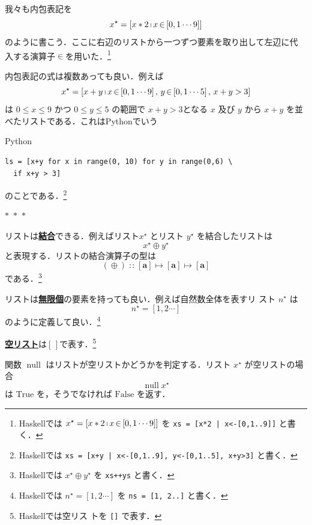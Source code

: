 \documentclass[a5paper,twoside,fleqn,draft]{jsbook}
\newcommand{\separator}{\begin{center}$*$~$*$~$*$\end{center}}
\newcommand{\programminglanguage}[1]{\textsf{#1}}
\newcommand{\haskell}{\programminglanguage{Haskell}}
\newcommand{\python}{\programminglanguage{Python}}
\newcommand{\keyword}[1]{{\underline{\textbf{#1}}}}
\newcommand{\code}[1]{\texttt{#1}}
\newenvironment{pythoncode}{\begin{itembox}[r]{\python}}{\end{itembox}}
\newcommand{\mSpecialConstant}[1]{\textrm{#1}} %
\newcommand{\mEmptyList}{{[\,]}}
\newcommand{\mFalse}{\mSpecialConstant{False}}
\newcommand{\mTrue}{\mSpecialConstant{True}}
\newcommand{\mSpecialFunc}[1]{\mathrm{#1}}
\DeclareMathOperator{\mNull}{\mSpecialFunc{null}}
\DeclareMathOperator{\mAppend}{\oplus}
\DeclareMathOperator{\mFrom}{\in}
\DeclareMathOperator{\mIn}{{:\!:}}
\DeclareMathOperator{\mMapsTo}{\mapsto}
\newcommand{\mType}[1]{\mathbf{#1}}
\newcommand{\mListType}[1]{[\mType{#1}]}
\newcommand{\mListWith}[1]{\left[#1\right]}
\newcommand{\mList}[1]{{#1}^\mathrm{\star}}
\DeclareMathOperator{\mListComp}{\shortmid}
\newcommand{\mProj}[2]{#1\mMapsTo#2}
\begin{document}
我々も内包表記を
\begin{equation}
  \mList{x}=\mListWith{x*2\mListComp x\mFrom{\mListWith{0,1\dotsb9}}}
\end{equation}
のように書こう．ここに右辺のリストから一つずつ要素を取り出して左辺に代
入する演算子$\mFrom$を用いた．\footnote{\haskell では
  $\mList{x}=\mListWith{x*2\mListComp x\mFrom{\mListWith{0,1\dotsb9}}}$
  を \code{xs = [x*2 | x<-[0,1..9]]} と書く．}

内包表記の式は複数あっても良い．例えば
\begin{equation}
  \mList{x}
  =\mListWith{x+y\mListComp x\mFrom\mListWith{0,1\dotsb9},\,
      y\mFrom\mListWith{0,1\dotsb5},\,x+y>3}
\end{equation}
は $0\le x\le9$ かつ $0\le y\le5$ の範囲で $x+y>3$となる $x$ 及び $y$
から $x+y$ を並べたリストである．これは\python でいう
\begin{pythoncode}
\begin{verbatim}
ls = [x+y for x in range(0, 10) for y in range(0,6) \
  if x+y > 3]
\end{verbatim}
\end{pythoncode}
のことである．\footnote{\haskell では \code{xs = [x+y | x<-[0,1..9],
      y<-[0,1..5], x+y>3]} と書く．}


\separator

リストは\keyword{結合}できる．例えばリスト$\mList{x}$ とリスト
$\mList{y}$ を結合したリストは
\begin{equation}
\mList{x}\mAppend\mList{y}
\end{equation}
と表現する．リストの結合演算子の型は
\begin{equation}
(\mAppend)\mIn{}\mProj{\mListType{a}}{\mProj{\mListType{a}}{\mListType{a}}}
\end{equation}
である．\footnote{\haskell では $\mList{x}\mAppend\mList{y}$ を
  \code{xs++ys} と書く．}

リストは\keyword{無限個}の要素を持っても良い．例えば自然数全体を表すリ
スト $\mList{n}$ は
\begin{equation}
\mList{n}=\mListWith{1,2\dotsb}
\end{equation}
のように定義して良い．\footnote{\haskell では
  $\mList{n}=\mListWith{1,2\dotsb}$ を \code{ns = [1, 2..]} と書く．}

\keyword{空リスト}は$\mEmptyList$で表す．\footnote{\haskell では空リス
  トを \code{[]} で表す．}

関数 $\mNull$ はリストが空リストかどうかを判定する．リスト $\mList{x}$
が空リストの場合
\begin{equation}
\mNull\mList{x}
\end{equation}
は $\mTrue$ を，そうでなければ $\mFalse$ を返す．
\end{document}
